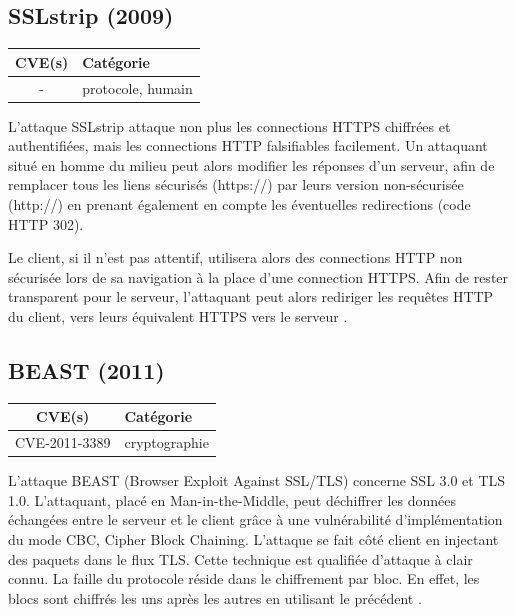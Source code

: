 

\subsection{SSLstrip (2009)}

\begin{tabularx}{0.96\textwidth}{|c|X|}
  \hline
  \textbf{CVE(s)} & \textbf{Catégorie} \\
  \hline
  - & protocole, humain \\
  \hline
\end{tabularx}

\vspace{1em}

L'attaque SSLstrip attaque non plus les connections HTTPS chiffrées et authentifiées, mais les connections HTTP falsifiables facilement. Un attaquant situé en homme du milieu peut alors modifier les réponses d'un serveur, afin de remplacer tous les liens sécurisés (https://) par leurs version non-sécurisée (http://) en prenant également en compte les éventuelles redirections (code HTTP 302).

Le client, si il n'est pas attentif, utilisera alors des connections HTTP non sécurisée lors de sa navigation à la place d'une connection HTTPS. Afin de rester transparent pour le serveur, l'attaquant peut alors rediriger les requêtes HTTP du client, vers leurs équivalent HTTPS vers le serveur \cite{sslstrip-website}.




\subsection{BEAST (2011)}

\begin{tabularx}{0.96\textwidth}{|c|X|}
  \hline
  \textbf{CVE(s)} & \textbf{Catégorie} \\
  \hline
  CVE-2011-3389 & cryptographie \\
  \hline
\end{tabularx}

\vspace{1em}

L'attaque BEAST (Browser Exploit Against SSL/TLS) concerne SSL 3.0 et TLS 1.0. L'attaquant, placé en Man-in-the-Middle, peut déchiffrer les données échangées entre le serveur et le client grâce à une vulnérabilité d'implémentation du mode CBC, Cipher Block Chaining. L'attaque se fait côté client en injectant des paquets dans le flux TLS. Cette technique est qualifiée d'attaque à clair connu. La faille du protocole réside dans le chiffrement par bloc. En effet, les blocs sont chiffrés les uns après les autres en utilisant le précédent \cite{beast}.

